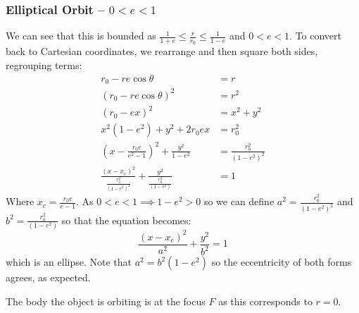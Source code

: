 \documentclass[../main.tex]{subfiles}
\begin{document}
\subsubsection{Elliptical Orbit -- $0 < e < 1$}
\label{rMinMax}
We can see that this is bounded as $\frac{1}{1 + e} \leq \frac{r}{r_0} \leq \frac{1}{1-e}$ and $0 < e < 1$.
To convert back to Cartesian coordinates, we rearrange and then square both sides, regrouping terms:
\begin{align*}
  r_0 - re\cos\theta &= r \\
  (r_0 - re\cos \theta)^2 &= r^2 \\
  (r_0 - ex)^2 &= x^2 + y^2 \\
  x^2(1 - e^2) + y^2 + 2r_0 ex &= r^2_0 \\
  \left(x - \frac{r_0 e}{e^2 - 1}\right)^2 + \frac{y^2}{1 - e^2} &= \frac{r^2_0}{(1 - e^2)^2} \\
  \frac{(x - x_c)^2}{\frac{r^2_0}{(1 - e^2)^2}} + \frac{y^2}{\frac{r^2_0}{(1 - e^2)}} &= 1
\end{align*}
Where $x_c = \frac{r_0 e}{e - 1}$.
As $0 < e < 1 \implies 1 - e^2 > 0$ so we can define $a^2 = \frac{r^2_0}{(1 - e^2)^2}$ and $b^2 = \frac{r^2_0}{(1 - e^2)}$ so that the equation becomes:
\[
  \frac{(x - x_c)^2}{a^2} + \frac{y^2}{b^2} = 1
\]
which is an ellipse.
Note that $a^2 = b^2(1 - e^2)$ so the eccentricity of both forms agrees, as expected.
\begin{center}
\end{center}
The body the object is orbiting is at the focus $F$ as this corresponds to $r = 0$.
\end{document}
